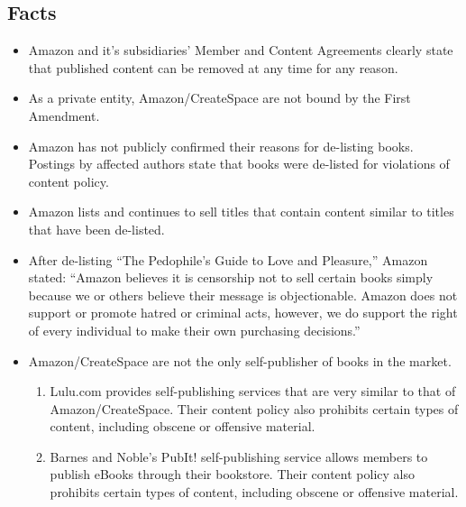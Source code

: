 \documentclass[11pt]{article}
\begin{document}
\newpage

\begin{multicols}{2}
\setcounter{page}{1}
\section{Facts}

\begin{itemize}

\item Amazon and it's subsidiaries' Member and Content Agreements clearly state that published content can be removed at any time for any reason. \cite{CreateSpaceMemberAgreement,CreateSpaceContentGuidelines,AmazonKDPContentGuidelines}

\item As a private entity, Amazon/CreateSpace are not bound by the First Amendment.

\item Amazon has not publicly confirmed their reasons for de-listing books. Postings by affected authors state that books were de-listed for violations of content policy. \cite{KittSelfPubRevolution} 

\item Amazon lists and continues to sell titles that contain content similar to titles that have been de-listed. \cite{AmazonLolitaDTPListing}

\item After de-listing ``The Pedophile's Guide to Love and Pleasure,'' Amazon stated: ``Amazon believes it is censorship not to sell certain books simply because we or others believe their message is objectionable.  Amazon does not support or promote hatred or criminal acts, however, we do support the right of every individual to make their own purchasing decisions.'' \cite{TechCrunchAmazonCensorship}

\item Amazon/CreateSpace are not the only self-publisher of books in the market.
   \begin{enumerate}
   
   \item Lulu.com provides self-publishing services that are very similar to that of Amazon/CreateSpace.  Their content policy also prohibits certain types of content, including obscene or offensive material. \cite{LuluMemberAgreement}

   \item Barnes and Noble's PubIt! self-publishing service allows members to publish eBooks through their bookstore.  Their content policy also prohibits certain types of content, including obscene or offensive material.  \cite[Select Service Policies, then Content Policy]{PubItContentPolicy}


\end{enumerate}
\end{itemize}
\end{multicols}
\end{document}
